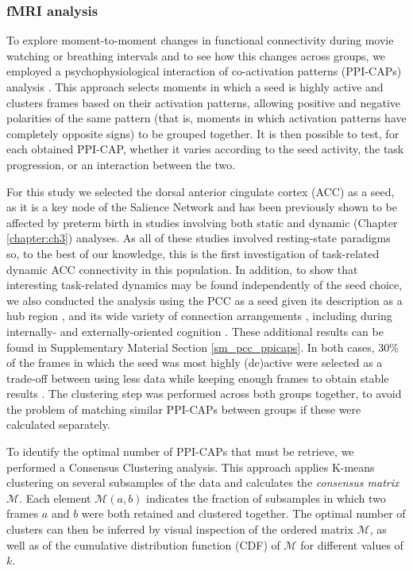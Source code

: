 \subsubsection{fMRI analysis} 
To explore moment-to-moment changes in functional connectivity during movie watching or breathing intervals and to see how this changes across groups, we employed a psychophysiological interaction of co-activation patterns (PPI-CAPs) analysis \citep{Freitas2020}. This approach selects moments in which a seed is highly active and clusters frames based on their activation patterns, allowing positive and negative polarities of the same pattern (that is, moments in which activation patterns have completely opposite signs) to be grouped together. It is then possible to test, for each obtained PPI-CAP, whether it varies according to the seed activity, the task progression, or an interaction between the two. 

For this study we selected the dorsal anterior cingulate cortex (ACC) as a seed, as it is a key node of the Salience Network and has been previously shown to be affected by preterm birth in studies involving both static \citep{White2014,Daamen2015,Lordier2019} and dynamic (Chapter \ref{chapter:ch3}) analyses. As all of these studies involved resting-state paradigms so, to the best of our knowledge, this is the first investigation of task-related dynamic ACC connectivity in this population. In addition, to show that interesting task-related dynamics may be found independently of the seed choice, we also conducted the analysis using the PCC as a seed given its description as a hub region \citep{Andrews-hanna2010}, and its wide variety of connection arrangements \citep{Lin2017}, including during internally- \citep{Raichle2001} and externally-oriented cognition  \citep{Freitas2020}. These additional results can be found in Supplementary Material Section \ref{sm_pcc_ppicaps}. In both cases, 30\% of the frames in which the seed was most highly (de)active were selected as a trade-off between using less data while keeping enough frames to obtain stable results \citep{Freitas2020}. The clustering step was performed across both groups together, to avoid the problem of matching similar PPI-CAPs between groups if these were calculated separately. 

To identify the optimal number of PPI-CAPs that must be retrieve, we performed a Consensus Clustering analysis\citep{Monti2003}. This approach applies K-means clustering on several subsamples of the data and calculates the \textit{consensus matrix} $\mathcal{M}$. Each element $\mathcal{M}(a,b)$ indicates the fraction of subsamples in which two frames $a$ and $b$ were both retained and clustered together. The optimal number of clusters can then be inferred by visual inspection of the ordered matrix $\mathcal{M}$, as well as of the cumulative distribution function (CDF) of $\mathcal{M}$  for different values of $k$. 


